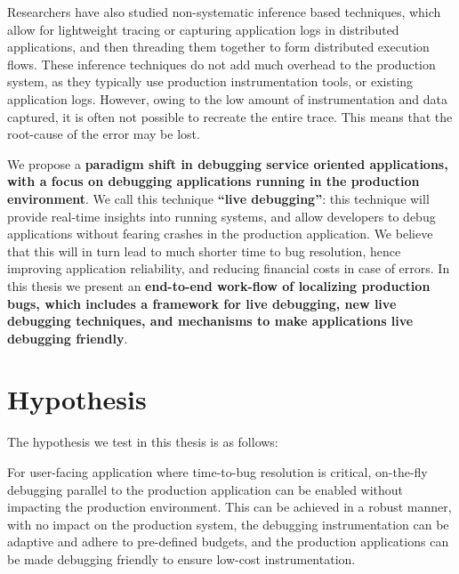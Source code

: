 Researchers have also studied non-systematic inference based techniques, which allow for lightweight tracing or capturing application logs in distributed applications, and then threading them together to form distributed execution flows.
These inference techniques do not add much overhead to the production system, as they typically use production instrumentation tools, or existing application logs.
However, owing to the low amount of instrumentation and data captured, it is often not possible to recreate the entire trace.
This means that the root-cause of the error may be lost.

We propose a \textbf{ paradigm shift in debugging service oriented applications, with a focus on debugging applications running in the production environment}.
We call this technique \textbf{``live debugging''}: this technique will provide real-time insights into running systems, and allow developers to debug applications without fearing crashes in the production application.
We believe that this will in turn lead to much shorter time to bug resolution, hence improving application reliability, and reducing financial costs in case of errors.
In this thesis we present an \textbf{end-to-end work-flow of localizing production bugs, which includes a framework for live debugging, new live debugging techniques, and mechanisms to make applications live debugging friendly}.\\


\section{Hypothesis}
\label{sec:introHypothesis}

The hypothesis we test in this thesis is as follows:

For user-facing application where time-to-bug resolution is critical, on-the-fly debugging parallel to the production application can be enabled without impacting the production environment. This can be achieved in a robust manner, with no impact on the production system, the debugging instrumentation can be adaptive and adhere to pre-defined budgets, and the production applications can be made debugging friendly to ensure low-cost instrumentation.\\

